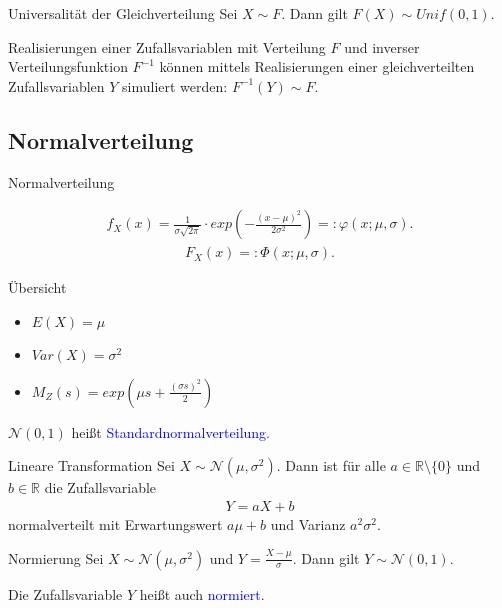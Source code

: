 \documentclass{beamer}
\def\padding{\vspace{0.5cm}}
\def\spadding{\vspace{0.25cm}}
\def\b{\textcolor{blue}}
\begin{document}
\begin{frame}
    \begin{block}{Universalität der Gleichverteilung}
        Sei $X \sim F$. Dann gilt $F(X) \sim Unif(0,1)$.\pause\par\spadding
        Realisierungen einer Zufallsvariablen mit Verteilung $F$ und inverser Verteilungsfunktion $F^{-1}$ können mittels Realisierungen einer gleichverteilten Zufallsvariablen $Y$ simuliert werden: $F^{-1}(Y) \sim F$.
    \end{block}
\end{frame}

\subsection{Normalverteilung}
\begin{frame}{Normalverteilung}
    \begin{definition}
        \begin{align*}
            f_X(x) = \frac{1}{\sigma \sqrt{2 \pi}} \cdot exp\left(-\frac{(x - \mu)^2}{2 \sigma^2}\right) =: \varphi(x;\mu,\sigma).
        \end{align*}
        \begin{align*}
            F_X(x) =: \Phi(x;\mu,\sigma).
        \end{align*}\pause
        \begin{exampleblock}{Übersicht}
            \begin{itemize}
                \item $E(X) = \mu$\pause
                \item $Var(X) = \sigma^2$\pause
                \item $M_Z(s) = exp(\mu s + \frac{(\sigma s)^2}{2})$
            \end{itemize}
        \end{exampleblock}
    \end{definition}
\end{frame}

\begin{frame}
    $\mathcal{N}(0,1)$ heißt \b{Standardnormalverteilung}.\pause\par\padding
    \begin{block}{Lineare Transformation}
        Sei $X \sim \mathcal{N}(\mu, \sigma^2)$. Dann ist für alle $a \in \mathbb{R} \setminus \{0\}$ und $b \in \mathbb{R}$ die Zufallsvariable
        \begin{align*}
            Y = a X + b
        \end{align*}
        normalverteilt mit Erwartungswert $a \mu + b$ und Varianz $a^2 \sigma^2$.
    \end{block}\pause\par\padding
    \begin{block}{Normierung}
        Sei $X \sim \mathcal{N}(\mu, \sigma^2)$ und $Y = \frac{X - \mu}{\sigma}$. Dann gilt $Y \sim \mathcal{N}(0,1)$.\pause\par
        Die Zufallsvariable $Y$ heißt auch \b{normiert}.
    \end{block}
\end{frame}
\end{document}
